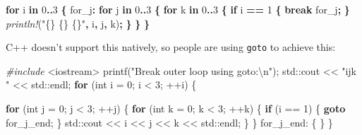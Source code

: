 \documentclass[
]{book}
\newenvironment{Shaded}{\begin{snugshade}}{\end{snugshade}}
\newcommand{\BuiltInTok}[1]{#1}
\newcommand{\ControlFlowTok}[1]{\textcolor[rgb]{0.13,0.29,0.53}{\textbf{#1}}}
\newcommand{\DataTypeTok}[1]{\textcolor[rgb]{0.13,0.29,0.53}{#1}}
\newcommand{\DecValTok}[1]{\textcolor[rgb]{0.00,0.00,0.81}{#1}}
\newcommand{\ImportTok}[1]{#1}
\newcommand{\KeywordTok}[1]{\textcolor[rgb]{0.13,0.29,0.53}{\textbf{#1}}}
\newcommand{\NormalTok}[1]{#1}
\newcommand{\OperatorTok}[1]{\textcolor[rgb]{0.81,0.36,0.00}{\textbf{#1}}}
\newcommand{\OtherTok}[1]{\textcolor[rgb]{0.56,0.35,0.01}{#1}}
\newcommand{\PreprocessorTok}[1]{\textcolor[rgb]{0.56,0.35,0.01}{\textit{#1}}}
\newcommand{\SpecialCharTok}[1]{\textcolor[rgb]{0.00,0.00,0.00}{#1}}
\newcommand{\StringTok}[1]{\textcolor[rgb]{0.31,0.60,0.02}{#1}}
\begin{document}
\begin{Shaded}
\begin{Highlighting}[]
\KeywordTok{for}\NormalTok{ i }\KeywordTok{in} \DecValTok{0}\OperatorTok{..}\DecValTok{3} \OperatorTok{\{}
    \OtherTok{\textquotesingle{}for\_j}\OperatorTok{:} \KeywordTok{for}\NormalTok{ j }\KeywordTok{in} \DecValTok{0}\OperatorTok{..}\DecValTok{3} \OperatorTok{\{}
        \KeywordTok{for}\NormalTok{ k }\KeywordTok{in} \DecValTok{0}\OperatorTok{..}\DecValTok{3} \OperatorTok{\{}
            \KeywordTok{if}\NormalTok{ i }\OperatorTok{==} \DecValTok{1} \OperatorTok{\{}
                \KeywordTok{break} \OtherTok{\textquotesingle{}for\_j}\OperatorTok{;}
            \OperatorTok{\}}
            \PreprocessorTok{println!}\NormalTok{(}\StringTok{"\{\} \{\} \{\}"}\OperatorTok{,}\NormalTok{ i}\OperatorTok{,}\NormalTok{ j}\OperatorTok{,}\NormalTok{ k)}\OperatorTok{;}
        \OperatorTok{\}}
    \OperatorTok{\}}
\OperatorTok{\}}
\end{Highlighting}
\end{Shaded}

C++ doesn't support this natively, so people are using \texttt{goto} to achieve this:

\begin{Shaded}
\begin{Highlighting}[]
\PreprocessorTok{\#include }\ImportTok{\textless{}iostream\textgreater{}}
\NormalTok{printf(}\StringTok{"Break outer loop using goto:}\SpecialCharTok{\textbackslash{}n}\StringTok{"}\NormalTok{);}
\BuiltInTok{std::}\NormalTok{cout \textless{}\textless{} }\StringTok{"ijk "}\NormalTok{ \textless{}\textless{} }\BuiltInTok{std::}\NormalTok{endl;}
\ControlFlowTok{for}\NormalTok{ (}\DataTypeTok{int}\NormalTok{ i = }\DecValTok{0}\NormalTok{; i \textless{} }\DecValTok{3}\NormalTok{; ++i)}
\NormalTok{\{}

    \ControlFlowTok{for}\NormalTok{ (}\DataTypeTok{int}\NormalTok{ j = }\DecValTok{0}\NormalTok{; j \textless{} }\DecValTok{3}\NormalTok{; ++j)}
\NormalTok{    \{}
        \ControlFlowTok{for}\NormalTok{ (}\DataTypeTok{int}\NormalTok{ k = }\DecValTok{0}\NormalTok{; k \textless{} }\DecValTok{3}\NormalTok{; ++k)}
\NormalTok{        \{}
            \ControlFlowTok{if}\NormalTok{ (i == }\DecValTok{1}\NormalTok{)}
\NormalTok{            \{}
                \ControlFlowTok{goto}\NormalTok{ for\_j\_end;}
\NormalTok{            \}}
            \BuiltInTok{std::}\NormalTok{cout \textless{}\textless{} i \textless{}\textless{} j \textless{}\textless{} k \textless{}\textless{} }\BuiltInTok{std::}\NormalTok{endl;}
\NormalTok{        \}}
\NormalTok{    \}}
\NormalTok{    for\_j\_end:}
\NormalTok{    \{}
\NormalTok{    \}}
\NormalTok{\}}
\end{Highlighting}
\end{Shaded}
\end{document}
